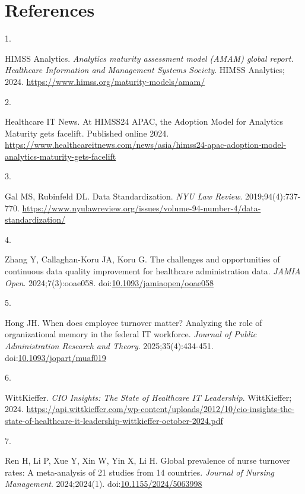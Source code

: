 \documentclass[
  american,
  11pt,
  letterpaper,
  oneside  ,captions=tableheading
]{scrartcl}
\newlength{\cslhangindent}
\newlength{\csllabelwidth}
\newenvironment{CSLReferences}[2] %
 {\begin{list}{}{%
  \setlength{\itemindent}{0pt}
  \setlength{\leftmargin}{0pt}
  \setlength{\parsep}{0pt}
  \ifodd #1
   \setlength{\leftmargin}{\cslhangindent}
   \setlength{\itemindent}{-1\cslhangindent}
  \fi
  \setlength{\itemsep}{#2\baselineskip}}}
 {\end{list}}
\newcommand{\CSLLeftMargin}[1]{\parbox[t]{\csllabelwidth}{\strut#1\strut}}
\newcommand{\CSLRightInline}[1]{\parbox[t]{\linewidth - \csllabelwidth}{\strut#1\strut}}
\begin{document}
\section{References}\label{references}

\protect{}\label{refs}
\begin{CSLReferences}{0}{1}
\CSLLeftMargin{1. }%
\CSLRightInline{HIMSS Analytics. \emph{{Analytics maturity assessment
model (AMAM) global report. Healthcare Information and Management
Systems Society}}. {HIMSS Analytics}; 2024.
\url{https://www.himss.org/maturity-models/amam/}}

\CSLLeftMargin{2. }%
\CSLRightInline{Healthcare IT News. {At HIMSS24 APAC, the Adoption Model
for Analytics Maturity gets facelift}. Published online 2024.
\url{https://www.healthcareitnews.com/news/asia/himss24-apac-adoption-model-analytics-maturity-gets-facelift}}

\CSLLeftMargin{3. }%
\CSLRightInline{Gal MS, Rubinfeld DL. {Data Standardization}. \emph{NYU
Law Review}. 2019;94(4):737-770.
\url{https://www.nyulawreview.org/issues/volume-94-number-4/data-standardization/}}

\CSLLeftMargin{4. }%
\CSLRightInline{Zhang Y, Callaghan-Koru JA, Koru G. {The challenges and
opportunities of continuous data quality improvement for healthcare
administration data}. \emph{JAMIA Open}. 2024;7(3):ooae058.
doi:\href{https://doi.org/10.1093/jamiaopen/ooae058}{10.1093/jamiaopen/ooae058}}

\CSLLeftMargin{5. }%
\CSLRightInline{Hong JH. When does employee turnover matter? Analyzing
the role of organizational memory in the federal IT workforce.
\emph{Journal of Public Administration Research and Theory}.
2025;35(4):434-451.
doi:\href{https://doi.org/10.1093/jopart/muaf019}{10.1093/jopart/muaf019}}

\CSLLeftMargin{6. }%
\CSLRightInline{WittKieffer. \emph{{CIO Insights: The State of
Healthcare IT Leadership}}. WittKieffer; 2024.
\url{https://api.wittkieffer.com/wp-content/uploads/2012/10/cio-insights-the-state-of-healthcare-it-leadership-wittkieffer-october-2024.pdf}}

\CSLLeftMargin{7. }%
\CSLRightInline{Ren H, Li P, Xue Y, Xin W, Yin X, Li H. {Global
prevalence of nurse turnover rates: A meta-analysis of 21 studies from
14 countries}. \emph{Journal of Nursing Management}. 2024;2024(1).
doi:\href{https://doi.org/10.1155/2024/5063998}{10.1155/2024/5063998}}


\end{CSLReferences}
\end{document}
